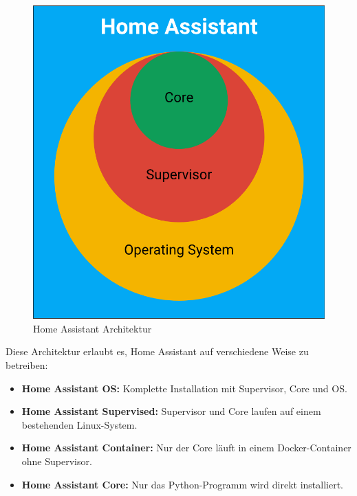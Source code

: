\vspace*{1cm}
\begin{figure}[H]
  \centering
  \begin{minipage}[b]{0.82\textwidth}
    \centering
    \includegraphics[width=\textwidth]{images/HA_Architecture.png}
  \end{minipage}
  \hspace{0.05\textwidth}
  \caption{Home Assistant Architektur}
  \label{fig:OSI-Modell}
\end{figure}
\vspace{1em}

\noindent
Diese Architektur erlaubt es, Home Assistant auf verschiedene Weise zu betreiben:
\begin{itemize}
  \item \textbf{Home Assistant OS:} Komplette Installation mit Supervisor, Core und OS.\\
  \item \textbf{Home Assistant Supervised:} Supervisor und Core laufen auf einem bestehenden Linux-System.\\
  \item \textbf{Home Assistant Container:} Nur der Core läuft in einem Docker-Container ohne Supervisor.\\
  \item \textbf{Home Assistant Core:} Nur das Python-Programm wird direkt installiert.
\end{itemize}

